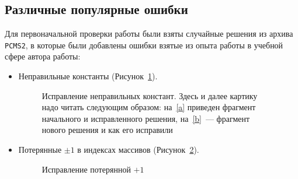 \subsection{Различные популярные ошибки}
Для первоначальной проверки работы были взяты случайные решения из архива \texttt{PCMS2}, в которые были добавлены ошибки взятые из
опыта работы в учебной сфере автора работы:
\begin{itemize}
    \item Неправильные константы (Рисунок~\ref{figConst}).
        \begin{figure}[!h]
{\caption{Исправление неправильных констант. Здесь и далее картику надо читать следующим образом: на~\ref{a}
приведен фрагмент начального и исправленного решения, на~\ref{b}~--- фрагмент нового решения и как его исправили}\label{figConst}}
\end{figure}

    \item Потерянные $\pm 1$ в индексах массивов (Рисунок~\ref{figInd}).
    
    \begin{figure}[!h]
{\caption{Исправление потерянной $+1$}\label{figInd}}
\end{figure}


\end{itemize}
